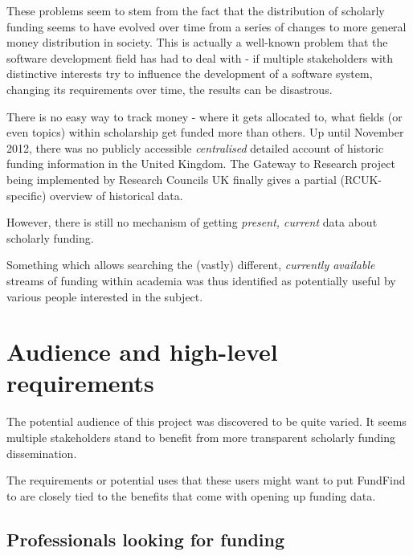 These problems seem to stem from the fact that the distribution of scholarly funding seems to have evolved over time from a series of changes to more general money distribution in society. This is actually a well-known problem that the software development field has had to deal with - if multiple stakeholders with distinctive interests try to influence the development of a software system, changing its requirements over time, the results can be disastrous.

There is no easy way to track money - where it gets allocated to, what fields (or even topics) within scholarship get funded more than others. Up until November 2012, there was no publicly accessible \emph{centralised} detailed account of historic funding information in the United Kingdom. The Gateway to Research project being implemented by Research Councils UK finally gives a partial (RCUK-specific) overview of historical data.

However, there is still no mechanism of getting \emph{present, current} data about scholarly funding.

Something which allows searching the (vastly) different, \emph{currently available} streams of funding within academia was thus identified as potentially useful by various people interested in the subject.

\section{Audience and high-level requirements}
\label{audience}
The potential audience of this project was discovered to be quite varied. It seems multiple stakeholders stand to benefit from more transparent scholarly funding dissemination.

The requirements or potential uses that these users might want to put FundFind to are closely tied to the benefits that come with opening up funding data.

\subsection{Professionals looking for funding}


